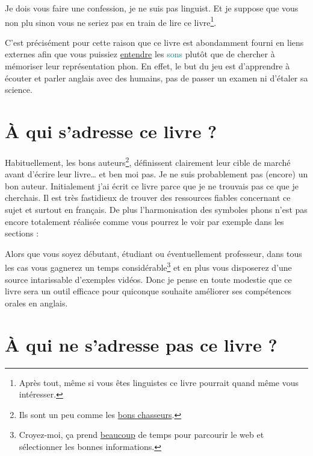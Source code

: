 Je dois vous faire une confession, je ne suis pas \gls{linguist}. Et je
suppose que vous non plu sinon vous ne seriez pas en train de lire ce
livre\footnote{Après tout, même si vous êtes linguistes ce livre
  pourrait quand même vous intéresser.}.

C'est précisément pour cette raison que ce livre est abondamment
fourni en liens externes afin que vous puissiez \underline{entendre}
les \textcolor{teal}{sons} plutôt que de chercher à mémoriser leur
représentation \gls{phon}. En effet, le but du jeu est d'apprendre à
écouter et parler anglais avec des humains, pas de passer un examen ni
d'étaler sa science.

\newpage

\section{À qui s'adresse ce livre ?}\label{sec:for-who}

Habituellement, les bons auteurs\footnote{Ils sont un peu comme les
  \href{https://www.amazon.fr/gp/product/B0103QW256/ref=as_li_tl?ie=UTF8\&camp=1642\&creative=6746\&creativeASIN=B0103QW256\&linkCode=as2\&tag=wwwbecomefree-21\&linkId=0a96fb10b5f781c84d66ef5b92ea65b6}{bons
    chasseurs}.}, définissent clairement leur cible de marché avant
d'écrire leur livre\dots\xspace et ben moi pas. Je ne suis probablement pas
(encore) un bon auteur. Initialement j'ai écrit ce livre parce que je
ne trouvais pas ce que je cherchais. Il est très fastidieux de trouver
des ressources fiables concernant ce sujet et surtout en français. De
plus l'\hypertarget{notation}{harmonisation} des symboles \glspl{phon}
n'est pas encore totalement réalisée comme vous pourrez le voir par
exemple dans les sections :



  

Alors que vous soyez débutant, étudiant ou éventuellement professeur,
dans tous les cas vous gagnerez un temps
considérable\footnote{Croyez-moi, ça prend \underline{beaucoup} de
temps pour parcourir le web et sélectionner les bonnes informations.}
et en plus vous disposerez d'une source intarissable d'exemples
vidéos. Donc je pense en toute modestie que ce livre sera un outil
efficace pour quiconque souhaite améliorer ses compétences orales en anglais.

\newpage

\section{À qui ne s'adresse pas ce livre ?}\label{sec:for-not-who}

